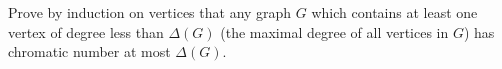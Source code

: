 \documentclass{book}
\begin{document}
\setcounter{cpjt}{46}
\addtocounter{cpjt}{-1}
\begin{activity}\label{activity-39}
\hypertarget{p-395}{}%
Prove by induction on vertices that any graph \(G\) which contains at least one vertex of degree less than \(\Delta(G)\) (the maximal degree of all vertices in \(G\)) has chromatic number at most \(\Delta(G)\).%
\par\smallskip%
\noindent\end{activity}

\clearpage
\end{document}
